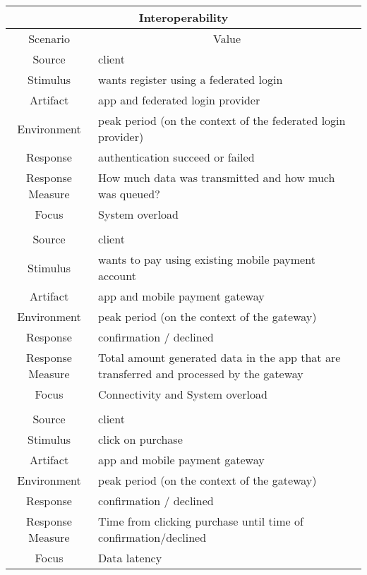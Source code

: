 \begin{table}[H]
    \begin{tabularx}{\textwidth}{|c|X|}
        \hline
        \multicolumn{2}{c}{\textbf{Interoperability}} \\
        \hline
        \toprule
        \multicolumn{1}{c}{Scenario} & \multicolumn{1}{c}{Value} \\
        \midrule
        Source & \gls{client} \\
        Stimulus & wants register using a \gls{federated login} \\
        Artifact & app and \gls{federated login} provider  \\
        Environment & peak period (on the context of the \gls{federated login} provider)\\
        Response & authentication succeed or failed\\
        Response Measure & How much data was transmitted and how much was queued? \\
        Focus & System overload \cite{refart:MKMS} \\
        & \\
        Source & \gls{client} \\
        Stimulus & wants to pay using existing mobile payment account \\
        Artifact & app and \gls{mobile payment gateway}  \\
        Environment & peak period (on the context of the gateway)\\
        Response & confirmation / declined \\
        Response Measure & Total amount generated data in the app that are transferred and processed by the gateway \\
        Focus & Connectivity and System overload \cite{refart:MKMS} \\
        & \\
        Source & \gls{client} \\
        Stimulus & click on purchase \\
        Artifact & app and \gls{mobile payment gateway}  \\
        Environment & peak period (on the context of the gateway)\\
        Response & confirmation / declined \\
        Response Measure & Time from clicking purchase until time of confirmation/declined \\
        Focus & Data latency \cite{refart:MKMS} \\
        \bottomrule
    \end{tabularx}
\end{table}
